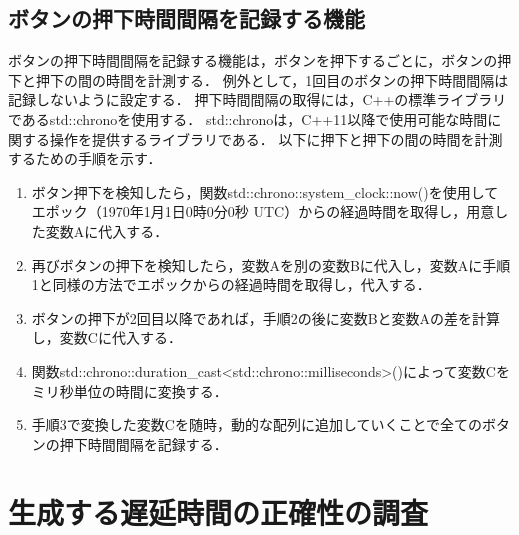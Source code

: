 \subsection{ボタンの押下時間間隔を記録する機能}
ボタンの押下時間間隔を記録する機能は，ボタンを押下するごとに，ボタンの押下と押下の間の時間を計測する．
例外として，1回目のボタンの押下時間間隔は記録しないように設定する．
押下時間間隔の取得には，C++の標準ライブラリであるstd::chronoを使用する．
std::chronoは，C++11以降で使用可能な時間に関する操作を提供するライブラリである．
以下に押下と押下の間の時間を計測するための手順を示す．
\begin{enumerate}[leftmargin=*]
\item ボタン押下を検知したら，関数std::chrono::system\_clock::now()を使用してエポック（1970年1月1日0時0分0秒 UTC）からの経過時間を取得し，用意した変数Aに代入する．
\item 再びボタンの押下を検知したら，変数Aを別の変数Bに代入し，変数Aに手順1と同様の方法でエポックからの経過時間を取得し，代入する．
\item ボタンの押下が2回目以降であれば，手順2の後に変数Bと変数Aの差を計算し，変数Cに代入する．
\item 関数std::chrono::duration\_cast\textless std::chrono::milliseconds\textgreater()によって変数Cをミリ秒単位の時間に変換する．
\item 手順3で変換した変数Cを随時，動的な配列に追加していくことで全てのボタンの押下時間間隔を記録する．
\end{enumerate}
\section{生成する遅延時間の正確性の調査}
